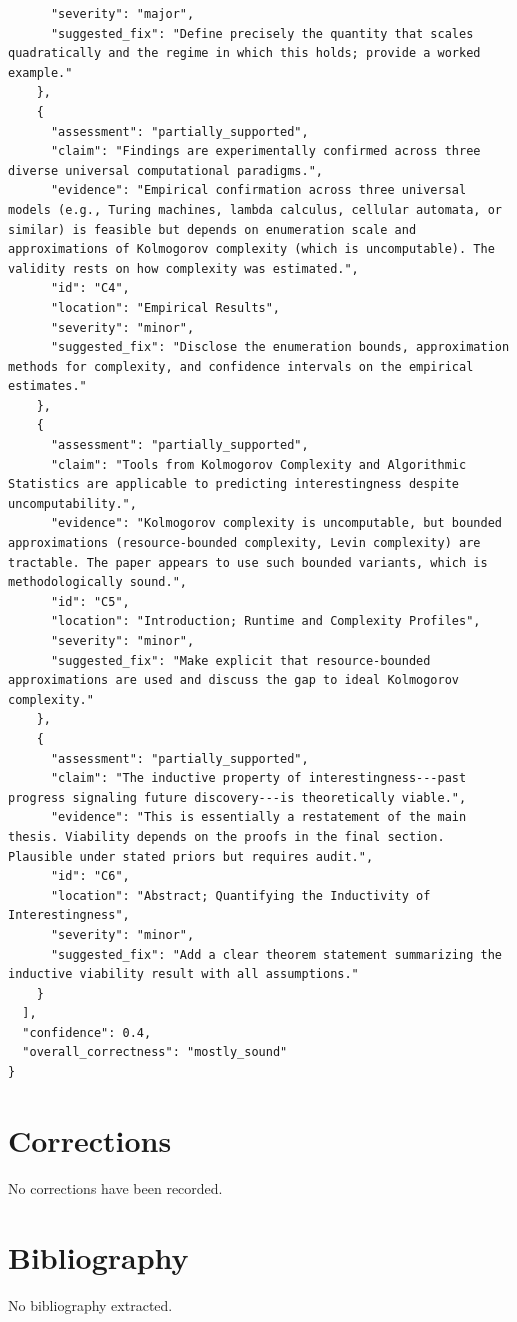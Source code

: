 \documentclass[11pt]{article}
\begin{document}
\begin{verbatim}
      "severity": "major",
      "suggested_fix": "Define precisely the quantity that scales quadratically and the regime in which this holds; provide a worked example."
    },
    {
      "assessment": "partially_supported",
      "claim": "Findings are experimentally confirmed across three diverse universal computational paradigms.",
      "evidence": "Empirical confirmation across three universal models (e.g., Turing machines, lambda calculus, cellular automata, or similar) is feasible but depends on enumeration scale and approximations of Kolmogorov complexity (which is uncomputable). The validity rests on how complexity was estimated.",
      "id": "C4",
      "location": "Empirical Results",
      "severity": "minor",
      "suggested_fix": "Disclose the enumeration bounds, approximation methods for complexity, and confidence intervals on the empirical estimates."
    },
    {
      "assessment": "partially_supported",
      "claim": "Tools from Kolmogorov Complexity and Algorithmic Statistics are applicable to predicting interestingness despite uncomputability.",
      "evidence": "Kolmogorov complexity is uncomputable, but bounded approximations (resource-bounded complexity, Levin complexity) are tractable. The paper appears to use such bounded variants, which is methodologically sound.",
      "id": "C5",
      "location": "Introduction; Runtime and Complexity Profiles",
      "severity": "minor",
      "suggested_fix": "Make explicit that resource-bounded approximations are used and discuss the gap to ideal Kolmogorov complexity."
    },
    {
      "assessment": "partially_supported",
      "claim": "The inductive property of interestingness---past progress signaling future discovery---is theoretically viable.",
      "evidence": "This is essentially a restatement of the main thesis. Viability depends on the proofs in the final section. Plausible under stated priors but requires audit.",
      "id": "C6",
      "location": "Abstract; Quantifying the Inductivity of Interestingness",
      "severity": "minor",
      "suggested_fix": "Add a clear theorem statement summarizing the inductive viability result with all assumptions."
    }
  ],
  "confidence": 0.4,
  "overall_correctness": "mostly_sound"
}
\end{verbatim}

\section*{Corrections}
No corrections have been recorded.

\section*{Bibliography}
No bibliography extracted.

% 
% 
\end{document}
